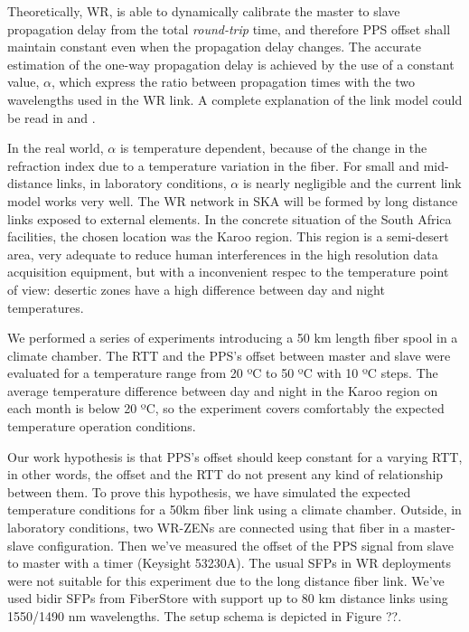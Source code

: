 Theoretically, WR, is able to dynamically calibrate the master to slave 
propagation delay from the total \textit{round-trip} time,  and therefore PPS offset shall maintain constant even 
when the propagation delay changes. The accurate estimation of the one-way 
propagation delay is achieved by the use of a constant value, $\alpha$, which 
express the ratio between propagation times with the two wavelengths used in 
the WR link. A complete explanation of the link model could be read in 
\cite{Wlostowski2011} and \cite{Daniluk2012}.

In the real world, $\alpha$ is temperature dependent, because of the change in 
the refraction index due to a temperature variation in the fiber. For small and 
mid-distance links, in laboratory conditions, $\alpha$ is nearly negligible and 
the current link model works very well. The WR network in SKA will be formed by 
long distance links exposed to external elements. In the concrete situation of 
the South Africa facilities, the chosen location was the Karoo region. 
 This region is a 
semi-desert area, very adequate to reduce human interferences in the high 
resolution data acquisition equipment, but with a inconvenient respec to the 
temperature point of view: desertic zones have a high difference between day 
and night temperatures.

We performed a series of experiments introducing a 50 km length fiber spool in 
a climate chamber. The RTT and the PPS's offset between master and slave were 
evaluated for a temperature range from 20 ºC to 50 ºC with 10 ºC steps. The 
average temperature difference between day and night in the Karoo region on 
each month is below 20 ºC, so the experiment covers comfortably the expected 
temperature operation conditions.

Our work hypothesis is that PPS's offset should keep constant for a varying 
RTT, in other words, the offset and the RTT do not present any kind of 
relationship between them. To prove this hypothesis, we have simulated the 
expected temperature conditions for a 50km fiber link using a climate chamber. 
Outside, in laboratory conditions, two WR-ZENs are connected using that fiber 
in a master-slave configuration. Then we've measured the offset of the PPS 
signal from slave to master with a timer (Keysight 53230A). The usual SFPs in 
WR deployments were not suitable for this experiment due to the long distance 
fiber link. We've used bidir SFPs from FiberStore with support up to 80 km 
distance links using 1550/1490 nm wavelengths. The setup schema is depicted in 
Figure ??. 

